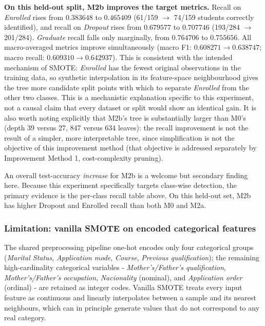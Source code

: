 \textbf{On this held-out split, M2b improves the target metrics.} Recall on
\textit{Enrolled} rises from
$0.383648$ to $0.465409$ (61/159 $\rightarrow$ 74/159 students correctly
identified), and recall on \textit{Dropout} rises from $0.679577$ to $0.707746$
(193/284 $\rightarrow$ 201/284). \textit{Graduate} recall falls only marginally,
from $0.764706$ to $0.755656$. All macro-averaged metrics improve simultaneously
(macro F1: $0.608271 \rightarrow 0.638747$; macro recall:
$0.609310 \rightarrow 0.642937$). This is consistent with the intended mechanism
of SMOTE: \textit{Enrolled} has the fewest original observations in the training
data, so synthetic interpolation in its feature-space neighbourhood gives the tree
more candidate split points with which to separate \textit{Enrolled} from the
other two classes. This is a mechanistic explanation specific to this experiment,
not a causal claim that every dataset or split would show an identical gain. It is
also worth noting explicitly that M2b's tree is substantially larger than M0's
(depth 39 versus 27, 847 versus 634 leaves): the recall improvement is not the
result of a simpler, more interpretable tree, since simplification is not the
objective of this improvement method (that objective is addressed separately by
Improvement Method 1, cost-complexity pruning).

An overall test-accuracy \emph{increase} for M2b is a welcome but secondary
finding here. Because this experiment specifically targets class-wise detection,
the primary evidence is the per-class recall table above. On this held-out set,
M2b has higher Dropout and Enrolled recall than both M0 and M2a.

\subsubsection{Limitation: vanilla SMOTE on encoded categorical features}
\label{sec:f2-limitation}

The shared preprocessing pipeline one-hot encodes only four
categorical groups (\textit{Marital Status}, \textit{Application mode},
\textit{Course}, \textit{Previous qualification}); the remaining high-cardinality
categorical variables - \textit{Mother's/Father's qualification},
\textit{Mother's/Father's occupation}, \textit{Nacionality} (nominal), and
\textit{Application order} (ordinal) - are retained as integer codes. Vanilla
SMOTE treats every input feature as continuous and linearly interpolates between a
sample and its nearest neighbours, which can in principle generate values that do
not correspond to any real category.

